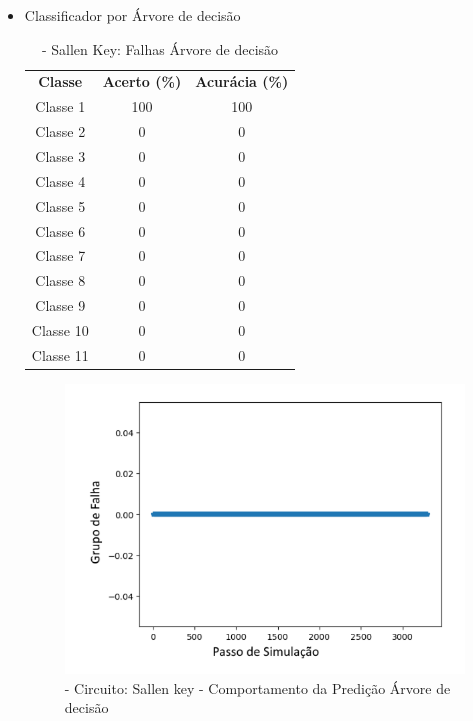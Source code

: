  
\begin{itemize}
\newpage
 \item Classificador por Árvore de decisão
 
\begin{table}[ht]
\centering
\begin{tabular}{ccc}
\textbf{Classe} & \textbf{Acerto (\%)} & \textbf{Acurácia (\%)} \\
Classe 1        & 100                  & 100                    \\
Classe 2        & 0                  & 0                    \\
Classe 3        & 0                  & 0                    \\
Classe 4        & 0                  & 0                    \\
Classe 5        & 0                  & 0                    \\
Classe 6        & 0                  & 0                    \\
Classe 7        & 0                  & 0                    \\
Classe 8        & 0                  & 0                    \\
Classe 9        & 0                  & 0                    \\
Classe 10       & 0                  & 0                    \\
Classe 11       & 0                  & 0                                       
\end{tabular}
\caption{\label{tab:sallenarvore}- Sallen Key: Falhas Árvore de decisão}
\end{table}

 \begin{figure}[H]
        \begin{center}
       \includegraphics[width=13cm]{./01_Pre_textuais/sallen_figs/DecisionTreeClassifier_Sallen_Key_mc_+_4bitPRBS_[FALHA]raw.png}
        \caption{\label{fig:DecisionTreeClassifieSalenkey}- Circuito: Sallen key - Comportamento da Predição Árvore de decisão}
        \end{center}
        \end{figure}
        

\end{itemize}
